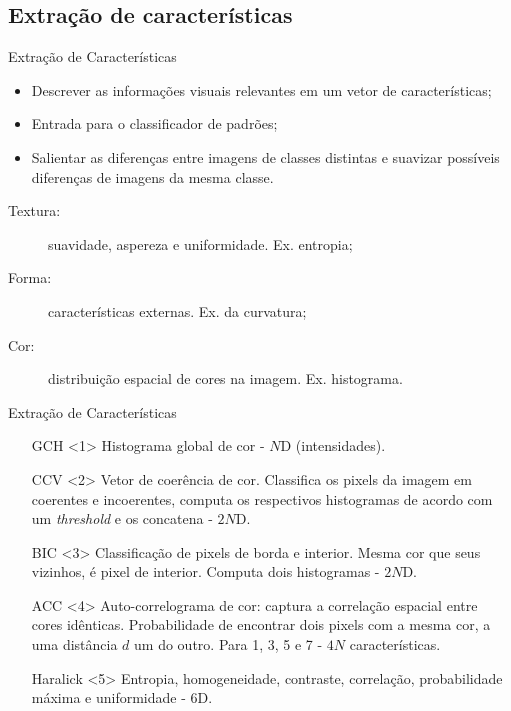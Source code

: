 \documentclass{beamer}
\begin{document}
\subsection{Extração de características}
\begin{frame}{Extração de Características}
\setlength\leftmargini{0em}
\justifying
\begin{itemize}
\item Descrever as informações visuais relevantes em um vetor de características;
\item Entrada para o classificador de padrões;
\item Salientar as diferenças entre imagens de classes distintas e suavizar possíveis diferenças de imagens da mesma classe.
\end{itemize}
\begin{description}%
\item [Textura:] suavidade, aspereza e uniformidade. Ex. entropia;
\item [Forma:] características externas. Ex. da curvatura;
\item [Cor:] distribuição espacial de cores na imagem. Ex. histograma.
\end{description}
\end{frame}
\begin{frame}{Extração de Características}
\setlength\leftmargini{1.5em}
\begin{itemize}
\item[GCH]<1> {Histograma global de cor - $N$D (intensidades).} %

\item[CCV]<2> {Vetor de coerência de cor. Classifica os pixels da imagem em coerentes e incoerentes, computa os respectivos histogramas de acordo com um \textit{threshold} e os concatena - $2N$D.} %

\item[BIC]<3> {Classificação de pixels de borda e interior. Mesma cor que seus vizinhos, é pixel de interior. Computa dois histogramas - $2N$D.}

\item[ACC]<4> {Auto-correlograma de cor: captura a correlação espacial entre cores idênticas. Probabilidade de encontrar dois pixels com a mesma cor, a uma distância $d$ um do outro. Para 1, 3, 5 e 7 - $4N$ características.}

\item[Haralick]<5> {Entropia, homogeneidade, contraste, correlação, probabilidade máxima e uniformidade - 6D.}
\end{itemize}
\end{frame}
\end{document}
